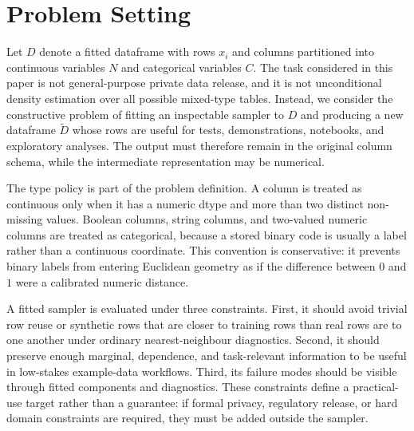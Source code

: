 \section{Problem Setting}
\label{sec:problem-setting}

Let $D$ denote a fitted dataframe with rows $x_i$ and columns partitioned into
continuous variables $N$ and categorical variables $C$. The task considered in
this paper is not general-purpose private data release, and it is not
unconditional density estimation over all possible mixed-type tables. Instead,
we consider the constructive problem of fitting an inspectable sampler to $D$
and producing a new dataframe $\tilde D$ whose rows are useful for tests,
demonstrations, notebooks, and exploratory analyses. The output must therefore
remain in the original column schema, while the intermediate representation may
be numerical.

The type policy is part of the problem definition. A column is treated as
continuous only when it has a numeric dtype and more than two distinct
non-missing values. Boolean columns, string columns, and two-valued numeric
columns are treated as categorical, because a stored binary code is usually a
label rather than a continuous coordinate. This convention is conservative: it
prevents binary labels from entering Euclidean geometry as if the difference
between $0$ and $1$ were a calibrated numeric distance.

A fitted sampler is evaluated under three constraints. First, it should avoid
trivial row reuse or synthetic rows that are closer to training rows than real
rows are to one another under ordinary nearest-neighbour diagnostics. Second,
it should preserve enough marginal, dependence, and task-relevant information
to be useful in low-stakes example-data workflows. Third, its failure modes
should be visible through fitted components and diagnostics. These constraints
define a practical-use target rather than a guarantee: if formal privacy,
regulatory release, or hard domain constraints are required, they must be added
outside the sampler.
